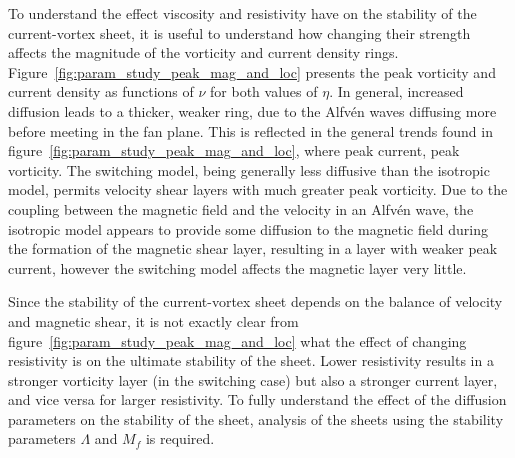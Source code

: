To understand the effect viscosity and resistivity have on the stability of the current-vortex sheet, it is useful to understand how changing their strength affects the magnitude of the vorticity and current density rings. Figure~\ref{fig:param_study_peak_mag_and_loc} presents the peak vorticity and current density as functions of $\nu$ for both values of $\eta$. In general, increased diffusion leads to a thicker, weaker ring, due to the Alfv\'en waves diffusing more before meeting in the fan plane. This is reflected in the general trends found in figure~\ref{fig:param_study_peak_mag_and_loc}, where peak current, peak vorticity. The switching model, being generally less diffusive than the isotropic model, permits velocity shear layers with much greater peak vorticity. Due to the coupling between the magnetic field and the velocity in an Alfv\'en wave, the isotropic model appears to provide some diffusion to the magnetic field during the formation of the magnetic shear layer, resulting in a layer with weaker peak current, however the switching model affects the magnetic layer very little.

Since the stability of the current-vortex sheet depends on the balance of velocity and magnetic shear, it is not exactly clear from figure~\ref{fig:param_study_peak_mag_and_loc} what the effect of changing resistivity is on the ultimate stability of the sheet. Lower resistivity results in a stronger vorticity layer (in the switching case) but also a stronger current layer, and vice versa for larger resistivity. To fully understand the effect of the diffusion parameters on the stability of the sheet, analysis of the sheets using the stability parameters $\Lambda$ and $M_f$ is required.

